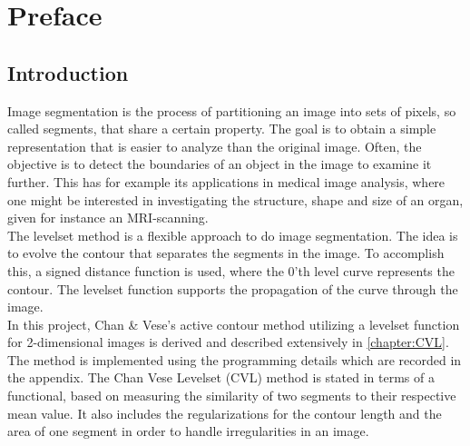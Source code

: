 
\chapter{Preface}\label{chapter:preface}
\section{Introduction}
Image segmentation is the process of partitioning an image into sets of pixels, so called segments, that share a certain property. The goal is to obtain a simple representation that is easier to analyze than the original image. Often, the objective is to detect the boundaries of an object in the image to examine it further. This has for example its applications in medical image analysis, where one might be interested in investigating the structure, shape and size of an organ, given for instance an MRI-scanning.\\

The levelset method is a flexible approach to do image segmentation. The idea is to evolve the contour that separates the segments in the image. To accomplish this, a signed distance function is used, where the 0'th level curve represents the contour. The levelset function supports the propagation of the curve through the image.\\

In this project, Chan \& Vese's active contour method \cite{chan.01} utilizing a levelset function for 2-dimensional images is derived and described extensively in \cref{chapter:CVL}. The method is implemented using the programming details which are recorded in the appendix. The Chan Vese Levelset (CVL) method is stated in terms of a functional, based on measuring the similarity of two segments to their respective mean value. It also includes the regularizations for the contour length and the area of one segment in order to handle irregularities in an image.\\

